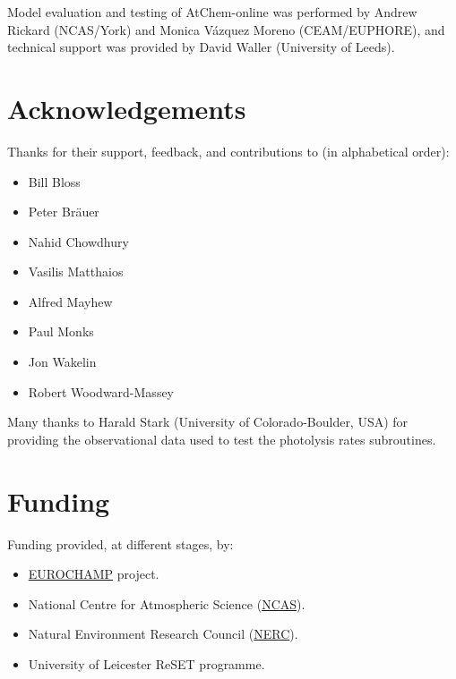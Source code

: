 Model evaluation and testing of AtChem-online was performed by Andrew
Rickard (NCAS/York) and Monica V{\'a}zquez Moreno (CEAM/EUPHORE), and
technical support was provided by David Waller (University of Leeds).

\section{Acknowledgements} \label{sec:acknowledgements}

Thanks for their support, feedback, and contributions to (in alphabetical order):

\begin{itemize}
\item Bill Bloss
\item Peter Br{\"a}uer
\item Nahid Chowdhury
\item Vasilis Matthaios
\item Alfred Mayhew
\item Paul Monks
\item Jon Wakelin
\item Robert Woodward-Massey
\end{itemize}

Many thanks to Harald Stark (University of Colorado-Boulder, USA) for providing
the observational data used to test the photolysis rates subroutines.

\section{Funding} \label{sec:funding}

Funding provided, at different stages, by:

\begin{itemize}
\item \href{https://www.eurochamp.org/}{EUROCHAMP} project.
\item National Centre for Atmospheric Science
  (\href{https://www.ncas.ac.uk/}{NCAS}).
\item Natural Environment Research Council
  (\href{https://nerc.ukri.org/}{NERC}).
\item University of Leicester ReSET programme.
\end{itemize}

